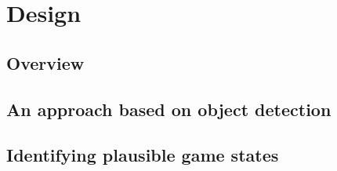 \documentclass[../main.tex]{subfiles}
\begin{document}
\chapter{Design}
\section{Overview}



\section{An approach based on object detection}
\section{Identifying plausible game states}
\end{document}

